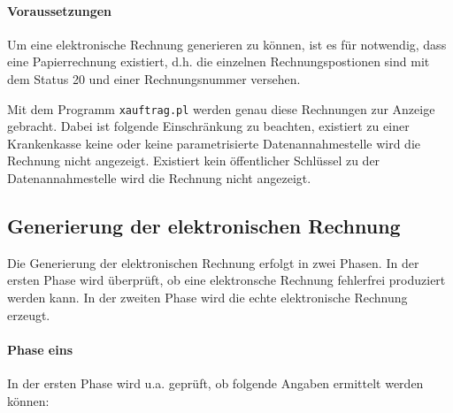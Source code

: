 \paragraph{Voraussetzungen}
Um eine elektronische Rechnung generieren zu können, ist es für \tinyHeb\/
notwendig, dass eine Papierrechnung existiert, d.h. die einzelnen
Rechnungspostionen sind mit dem Status 20 und einer Rechnungsnummer
versehen.

Mit dem Programm \verb|xauftrag.pl| werden genau diese Rechnungen zur 
Anzeige gebracht. Dabei ist folgende Einschränkung zu beachten, existiert
zu einer Krankenkasse keine oder keine parametrisierte Datenannahmestelle
wird die Rechnung nicht angezeigt. Existiert kein öffentlicher Schlüssel
 zu der Datenannahmestelle wird die Rechnung
nicht angezeigt.

\subsection{Generierung der elektronischen Rechnung}
Die Generierung der elektronischen Rechnung erfolgt in zwei Phasen.
In der ersten Phase wird überprüft, ob eine elektronsche Rechnung
fehlerfrei produziert werden kann.
In der zweiten Phase wird die echte elektronische Rechnung erzeugt.

\paragraph{Phase eins}
In der ersten Phase wird u.a. geprüft, ob folgende Angaben ermittelt werden
können:

